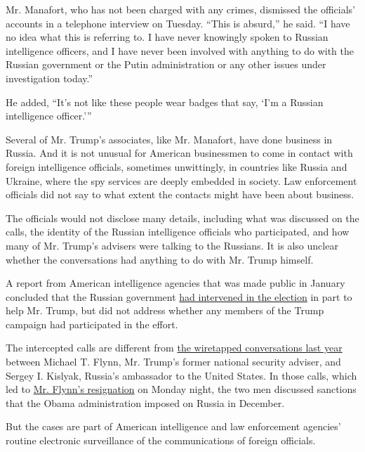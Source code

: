 Mr. Manafort, who has not been charged with any crimes, dismissed the
officials' accounts in a telephone interview on Tuesday. ``This is
absurd,'' he said. ``I have no idea what this is referring to. I have
never knowingly spoken to Russian intelligence officers, and I have
never been involved with anything to do with the Russian government or
the Putin administration or any other issues under investigation
today.''

He added, ``It's not like these people wear badges that say, `I'm a
Russian intelligence officer.'''

Several of Mr. Trump's associates, like Mr. Manafort, have done business
in Russia. And it is not unusual for American businessmen to come in
contact with foreign intelligence officials, sometimes unwittingly, in
countries like Russia and Ukraine, where the spy services are deeply
embedded in society. Law enforcement officials did not say to what
extent the contacts might have been about business.

The officials would not disclose many details, including what was
discussed on the calls, the identity of the Russian intelligence
officials who participated, and how many of Mr. Trump's advisers were
talking to the Russians. It is also unclear whether the conversations
had anything to do with Mr. Trump himself.

A report from American intelligence agencies that was made public in
January concluded that the Russian government
\href{https://www.nytimes.com/2016/12/09/us/obama-russia-election-hack.html}{had
intervened in the election} in part to help Mr. Trump, but did not
address whether any members of the Trump campaign had participated in
the effort.

The intercepted calls are different from
\href{https://www.nytimes.com/2017/02/09/us/flynn-is-said-to-have-talked-to-russians-about-sanctions-before-trump-took-office.html}{the
wiretapped conversations last year} between Michael T. Flynn, Mr.
Trump's former national security adviser, and Sergey I. Kislyak,
Russia's ambassador to the United States. In those calls, which led to
\href{https://www.nytimes.com/2017/02/13/us/politics/donald-trump-national-security-adviser-michael-flynn.html}{Mr.
Flynn's resignation} on Monday night, the two men discussed sanctions
that the Obama administration imposed on Russia in December.

But the cases are part of American intelligence and law enforcement
agencies' routine electronic surveillance of the communications of
foreign officials.

